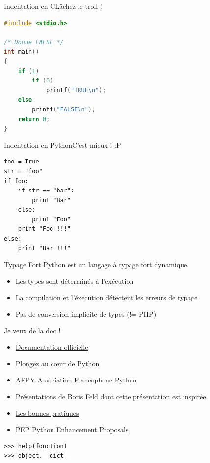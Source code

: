 \documentclass{beamer}
\begin{document}
\begin{frame}[fragile]{Indentation en C}{Lâchez le troll !}
\begin{lstlisting}[language=C]
#include <stdio.h>

/* Donne FALSE */
int main()
{
    if (1)
        if (0)
            printf("TRUE\n");
    else
        printf("FALSE\n");
    return 0;
}
\end{lstlisting}

\end{frame}

\begin{frame}[fragile]{Indentation en Python}{C'est mieux ! :P}
 
\begin{lstlisting}
foo = True
str = "foo"
if foo:
    if str == "bar":
        print "Bar"
    else:
        print "Foo"
    print "Foo !!!"
else:
    print "Bar !!!"
\end{lstlisting}

\end{frame}

\begin{frame}{Typage Fort}
Python est un langage à typage fort dynamique.

\begin{itemize}
 \item Les types sont déterminés à l'exécution
 \item La compilation et l'éxecution détectent les erreurs de typage
 \item Pas de conversion implicite de types (!= PHP)
\end{itemize}

\end{frame}



\begin{frame}[fragile]{Je veux de la doc !}
\begin{itemize}
 \item \href{http://docs.python.org/}{Documentation officielle}
 \item \href{http://diveintopython.adrahon.org/}{Plongez au c\oe{}ur de Python}
 \item \href{http://www.afpy.org/}{AFPY Association Francophone Python}
 \item \href{http://feldboris.alwaysdata.net/blog/pages/presentations/}{Présentations de Boris Feld dont cette présentation est inspirée}
 \item \href{http://www.biologeek.com/bonnes-pratiques,conferences,django,python,traduction/bonnes-pratiques-et-astuces-python/}{Les bonnes pratiques}
 \item \href{http://www.python.org/dev/peps/}{PEP Python Enhancement Proposals}
\end{itemize}

\begin{lstlisting}
>>> help(fonction)
>>> object.__dict__
\end{lstlisting}


\end{frame}
\end{document}
